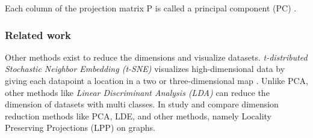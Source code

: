 \noindent Each column of the projection matrix P is called a principal component (PC) \cite{xu10701MachineLearning}. 


\subsubsection{Related work}
\label{subsubsec:dimension-reduction-related-work}
Other methods exist to reduce the dimensions and visualize datasets. \emph{t-distributed Stochastic Neighbor Embedding (t-SNE)} visualizes high-dimensional data by giving each datapoint a location in a two or three-dimensional map \cite{vandermaaten08}. Unlike PCA, other methods like \emph{Linear Discriminant Analysis (LDA)} \cite{balakrishnamaLINEARDISCRIMINANTANALYSIS} can reduce the dimension of datasets with multi classes. In \cite{yanGraphEmbeddingExtensions2007} study and compare dimension reduction methods like PCA, LDE, and other methods, namely Locality Preserving Projections (LPP) on graphs.
